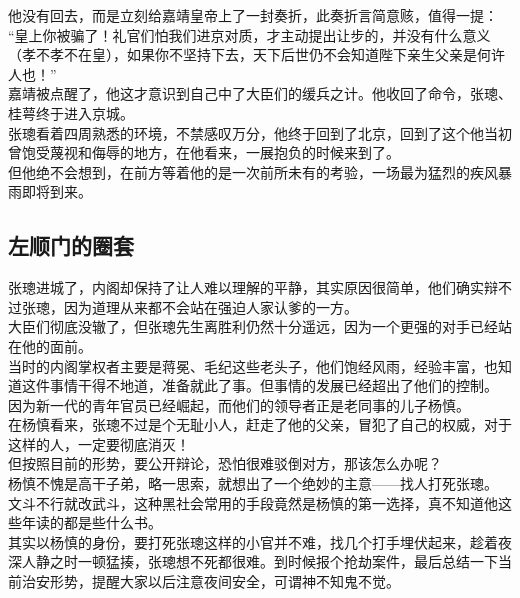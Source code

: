 \begin{multicols}{\theparacolNo}
他没有回去，而是立刻给嘉靖皇帝上了一封奏折，此奏折言简意赅，值得一提：\\

“皇上你被骗了！礼官们怕我们进京对质，才主动提出让步的，并没有什么意义（孝不孝不在皇），如果你不坚持下去，天下后世仍不会知道陛下亲生父亲是何许人也！”\\

嘉靖被点醒了，他这才意识到自己中了大臣们的缓兵之计。他收回了命令，张璁、桂萼终于进入京城。\\

张璁看着四周熟悉的环境，不禁感叹万分，他终于回到了北京，回到了这个他当初曾饱受蔑视和侮辱的地方，在他看来，一展抱负的时候来到了。\\

但他绝不会想到，在前方等着他的是一次前所未有的考验，一场最为猛烈的疾风暴雨即将到来。\\

\subsection{左顺门的圈套}
张璁进城了，内阁却保持了让人难以理解的平静，其实原因很简单，他们确实辩不过张璁，因为道理从来都不会站在强迫人家认爹的一方。\\

大臣们彻底没辙了，但张璁先生离胜利仍然十分遥远，因为一个更强的对手已经站在他的面前。\\

当时的内阁掌权者主要是蒋冕、毛纪这些老头子，他们饱经风雨，经验丰富，也知道这件事情干得不地道，准备就此了事。但事情的发展已经超出了他们的控制。\\

因为新一代的青年官员已经崛起，而他们的领导者正是老同事的儿子杨慎。\\

在杨慎看来，张璁不过是个无耻小人，赶走了他的父亲，冒犯了自己的权威，对于这样的人，一定要彻底消灭！\\

但按照目前的形势，要公开辩论，恐怕很难驳倒对方，那该怎么办呢？\\

杨慎不愧是高干子弟，略一思索，就想出了一个绝妙的主意——找人打死张璁。\\

文斗不行就改武斗，这种黑社会常用的手段竟然是杨慎的第一选择，真不知道他这些年读的都是些什么书。\\

其实以杨慎的身份，要打死张璁这样的小官并不难，找几个打手埋伏起来，趁着夜深人静之时一顿猛揍，张璁想不死都很难。到时候报个抢劫案件，最后总结一下当前治安形势，提醒大家以后注意夜间安全，可谓神不知鬼不觉。\\


\end{multicols}
